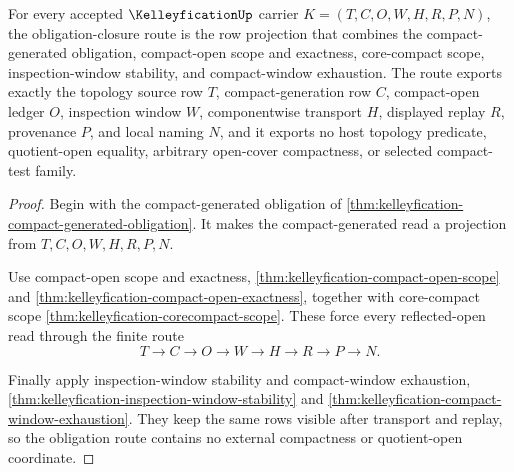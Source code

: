 \begin{theorem}
\label{thm:kelleyfication-obligation-closure-route}
For every accepted $\KelleyficationUp$ carrier $K=(T,C,O,W,H,R,P,N)$, the obligation-closure route is the row projection that combines the compact-generated obligation, compact-open scope and exactness, core-compact scope, inspection-window stability, and compact-window exhaustion. The route exports exactly the topology source row $T$, compact-generation row $C$, compact-open ledger $O$, inspection window $W$, componentwise transport $H$, displayed replay $R$, provenance $P$, and local naming $N$, and it exports no host topology predicate, quotient-open equality, arbitrary open-cover compactness, or selected compact-test family.
\end{theorem}
\begin{proof}
Begin with the compact-generated obligation of \autoref{thm:kelleyfication-compact-generated-obligation}. It makes the compact-generated read a projection from $T,C,O,W,H,R,P,N$.

Use compact-open scope and exactness, \autoref{thm:kelleyfication-compact-open-scope} and \autoref{thm:kelleyfication-compact-open-exactness}, together with core-compact scope \autoref{thm:kelleyfication-corecompact-scope}. These force every reflected-open read through the finite route
$$
T \to C \to O \to W \to H \to R \to P \to N.
$$

Finally apply inspection-window stability and compact-window exhaustion, \autoref{thm:kelleyfication-inspection-window-stability} and \autoref{thm:kelleyfication-compact-window-exhaustion}. They keep the same rows visible after transport and replay, so the obligation route contains no external compactness or quotient-open coordinate.
\end{proof}

